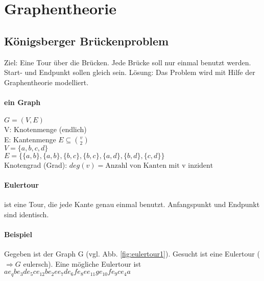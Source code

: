 \renewcommand{\ldate}{2015-05-18}	%

\section{Graphentheorie}

\subsection{Königsberger Brückenproblem}
Ziel: Eine Tour über die Brücken. Jede Brücke soll nur einmal benutzt werden. Start- und Endpunkt sollen gleich sein. 
Lösung: Das Problem wird mit Hilfe der Graphentheorie modelliert. 






\paragraph{ein Graph} 
$G = (V,E)$\\
V: Knotenmenge (endlich) \\
E: Kantenmenge $E \subseteq \binom{v}{2}$ \\
$V=\{a,b,c,d\}$\\
$E=\{\{a,b\},\{a,b\},\{b,c\},\{b,c\},\{a,d\},\{b,d\},\{c,d\}\}$\\
Knotengrad (Grad): $deg(v) = \mbox{Anzahl von Kanten mit v inzident}$

\paragraph{Eulertour} ist eine Tour, die jede Kante genau einmal benutzt. Anfangspunkt und Endpunkt sind identisch. 

\paragraph{Beispiel} Gegeben ist der Graph G (vgl. Abb. \ref{fig:eulertour1}). Gesucht ist eine Eulertour ($\Rightarrow G$ eulersch). Eine mögliche Eulertour ist $a e_q b e_3 d e_5 c e_{12} b e_2 e e_7 d e_6 f e_8 e e_{11} g e_{10} f e_9 c e_4 a$




